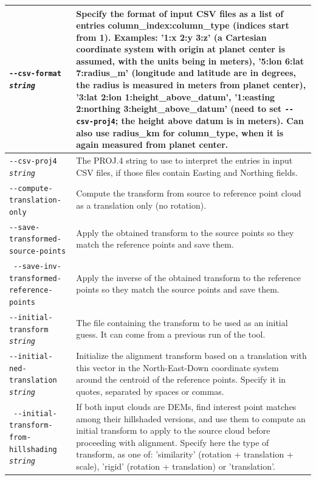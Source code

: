 \begin{longtable}{|p{8cm}|p{9cm}|}
\texttt{-\/-csv-format \textit{string}} & Specify the format of input
CSV files as a list of entries column\_index:column\_type (indices start
from 1). Examples: '1:x 2:y 3:z' (a Cartesian coordinate system with
origin at planet center is assumed, with the units being in meters),
'5:lon 6:lat 7:radius\_m' (longitude and latitude are in degrees, the
radius is measured in meters from planet center), '3:lat 2:lon
1:height\_above\_datum', '1:easting 2:northing 3:height\_above\_datum'
(need to set \texttt{-\/-csv-proj4}; the height above datum is in
meters). Can also use radius\_km for column\_type, when it is again
measured from planet center. \\ \hline

\texttt{-\/-csv-proj4 \textit{string}} & The PROJ.4 string to use to
interpret the entries in input CSV files, if those files contain Easting
and Northing fields.  \\ \hline

\texttt{-\/-compute-translation-only} & Compute the transform from source to reference point cloud as a translation only (no rotation). \\ \hline
\texttt{-\/-save-transformed-source-points} & Apply the obtained transform to the source points so they match the reference points and save them. \\ \hline
\texttt{ -\/-save-inv-transformed-reference-points} & Apply the inverse of the obtained transform to the reference points so they match the source points and save them.
\\ \hline

\texttt{-\/-initial-transform \textit{string}} &
The file containing the transform to be used as an
initial guess. It can come from a previous run of the tool. \\ \hline

\texttt{-\/-initial-ned-translation \textit{string}} &  Initialize the alignment transform based on a translation with this vector in the North-East-Down coordinate system around the centroid of the reference points. Specify it in quotes, separated by spaces or commas. \\ \hline

\texttt{ -\/-initial-transform-from-hillshading \textit{string}} & If both input clouds are DEMs, find interest point matches among their hillshaded versions, and use them to compute an initial transform to apply to the source cloud before proceeding with alignment. Specify here the type of transform, as one of: 'similarity' (rotation + translation + scale), 'rigid' (rotation + translation) or 'translation'.
\\ \hline


\end{longtable}
